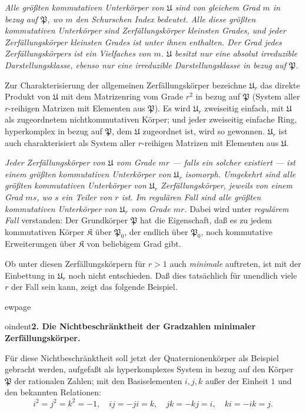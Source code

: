 \documentclass[12pt,a4paper]{article}
\newcommand{\PP}{\mathfrak{P}}          %
\theoremstyle{definition}
\begin{document}
\textit{Alle gr\"o\ss ten kommutativen Unterk\"orper von $\mathfrak{U}$ sind von
gleichem Grad $m$ in bezug auf $\PP$, wo $m$ den Schurschen Index
bedeutet. Alle diese gr\"o\ss ten kommutativen Unterk\"orper sind
Zerf\"allungsk\"orper kleinsten Grades, und jeder Zerf\"allungsk\"orper
kleinsten Grades ist unter ihnen enthalten. Der Grad jedes
Zerf\"allungsk\"orpers ist ein Vielfaches von $m$. $\mathfrak{U}$ besitzt
nur eine absolut irreduzible Darstellungsklasse, ebenso nur eine
irreduzible Darstellungsklasse in bezug auf $\PP$.}

Zur Charakterisierung der allgemeinen Zerf\"allungsk\"orper bezeichne
$\mathfrak{U}_r$ das direkte Produkt von $\mathfrak{U}$ mit dem
Matrizenring vom Grade $r^2$ in bezug auf $\PP$ (System aller
$r$-reihigen Matrizen mit Elementen aus $\PP$). Es wird $\mathfrak{U}_r$
zweiseitig einfach, mit $\mathfrak{U}$ als zugeordnetem nichtkommutativen
K\"orper; und jeder zweiseitig einfache Ring, hyperkomplex in bezug auf
$\PP$, dem $\mathfrak{U}$ zugeordnet ist, wird so gewonnen.
$\mathfrak{U}_r$ ist auch charakterisiert als System aller $r$-reihigen
Matrizen mit Elementen aus $\mathfrak{U}$.

\textit{Jeder Zerf\"allungsk\"orper von $\mathfrak{U}$ vom Grade $mr$ --- falls
ein solcher existiert --- ist einem gr\"o\ss ten kommutativen Unterk\"orper
von $\mathfrak{U}_r$ isomorph. Umgekehrt sind alle gr\"o\ss ten kommutativen
Unterk\"orper von $\mathfrak{U}_r$ Zerf\"allungsk\"orper, jeweils von einem
Grad $ms$, wo $s$ ein Teiler von $r$ ist. Im \textit{regul\"aren} Fall sind
alle gr\"o\ss ten kommutativen Unterk\"orper von $\mathfrak{U}_r$ vom Grade
$mr$.} Dabei wird unter \textit{regul\"arem Fall} verstanden: Der
Grundk\"orper $\PP$ hat die Eigenschaft, da\ss{} es zu jedem kommutativen
K\"orper $\mathfrak{K}$ \"uber $\PP_0$, der endlich \"uber $\PP_0$, noch
kommutative Erweiterungen \"uber $\mathfrak{K}$ von beliebigem Grad
gibt.

Ob unter diesen Zerf\"allungsk\"orpern f\"ur $r > 1$ auch \textit{minimale}
auftreten, ist mit der Einbettung in $\mathfrak{U}_r$ noch nicht
entschieden. Da\ss{} dies tats\"achlich f\"ur unendlich viele $r$ der Fall
sein kann, zeigt das folgende Beispiel.



ewpage
\setcounter{page}{569}



oindent\textbf{2. Die Nichtbeschr\"anktheit der Gradzahlen minimaler
Zerf\"allungsk\"orper.}

F\"ur diese Nichtbeschr\"anktheit soll jetzt der Quaternionenk\"orper als
Beispiel gebracht werden, aufgefa\ss t als hyperkomplexes System in bezug
auf den K\"orper $\PP$ der rationalen Zahlen; mit den Basiselementen $i,
j, k$ au\ss er der Einheit $1$ und den bekannten Relationen:
\[
i^2 = j^2 = k^2 = -1, \quad ij = -ji = k, \quad jk = -kj = i, \quad
ki = -ik = j.
\]
\end{document}
